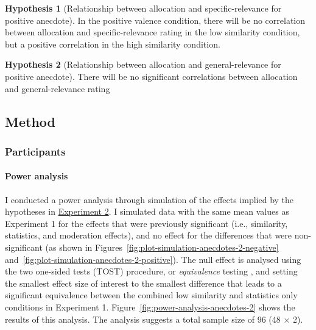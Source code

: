 \documentclass[a4paper, nobind, dvipsnames]{templates/ociamthesis}
\theoremstyle{definition}
\theoremstyle{definition}
\theoremstyle{definition}
\theoremstyle{definition}
\newtheorem{hypothesis}{Hypothesis}[chapter]
\theoremstyle{remark}
\begin{document}
\begin{hypothesis}[Relationship between allocation and specific-relevance for positive anecdote]
\protect\hypertarget{hyp:allocation-specific-relevance-anecdotes-2}{}{\label{hyp:allocation-specific-relevance-anecdotes-2} {} }In the positive valence condition, there will be no correlation between
allocation and specific-relevance rating in the low similarity condition, but a
positive correlation in the high similarity condition.
\end{hypothesis}

\begin{hypothesis}[Relationship between allocation and general-relevance for positive anecdote]
\protect\hypertarget{hyp:allocation-general-relevance-anecdotes-2}{}{\label{hyp:allocation-general-relevance-anecdotes-2} {} }There will be no significant correlations between allocation and
general-relevance rating
\end{hypothesis}

\subsection{Method}

\subsubsection{Participants}

\hypertarget{power-analysis-anecdotes-2}{%
\paragraph{Power analysis}\label{power-analysis-anecdotes-2}}

I conducted a power analysis through simulation of the effects implied by the
hypotheses in \protect\hyperlink{anecdotes-2}{Experiment 2}. I simulated data with the same mean
values as Experiment 1 for the effects that were previously significant (i.e.,
similarity, statistics, and moderation effects), and no effect for the
differences that were non-significant (as shown in
Figures~\ref{fig:plot-simulation-anecdotes-2-negative}
and~\ref{fig:plot-simulation-anecdotes-2-positive}). The null effect is
analysed using the two one-sided tests (TOST) procedure, or \emph{equivalence}
testing \autocite{lakens2018}, and setting the smallest effect size of interest to the
smallest difference that leads to a significant equivalence between the combined
low similarity and statistics only conditions in Experiment 1.
Figure~\ref{fig:power-analysis-anecdotes-2} shows the results of this analysis.
The analysis suggests a total sample size of 96
(48 \(\times\) 2).
\end{document}
